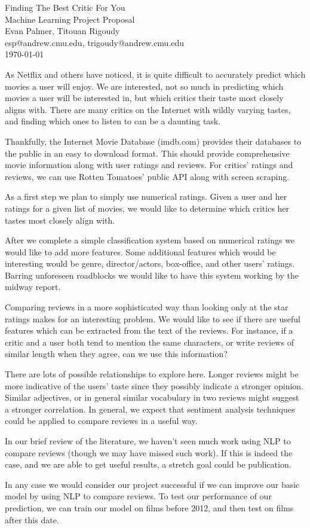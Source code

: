 \documentclass[12pt]{article}
\makeatletter
\newcommand{\myname}{Evan Palmer, Titouan Rigoudy}
\newcommand{\myandrew}{esp@andrew.cmu.edu, trigoudy@andrew.cmu.edu}
\newcommand{\thedate}{\today}
\makeatother
\begin{document}
	\medskip    
	\thispagestyle{plain}
	\begin{center}                 
	{\LARGE Finding The Best Critic For You} \\
	\medskip
	Machine Learning Project Proposal \\
	\smallskip
	\myname \\
	\myandrew \\
	\thedate \\
	\end{center}
	\vspace{0.5cm}

As Netflix and others have noticed, it is quite difficult to accurately predict which movies a user will enjoy. We are interested, not so much in predicting which movies a user will be interested in, but which critics their taste most closely aligns with. There are many critics on the Internet with wildly varying tastes, and finding which ones to listen to can be a daunting task.

Thankfully, the Internet Movie Database (imdb.com) provides their databases to the public in an easy to download format. This should provide comprehensive movie information along with user ratings and reviews. For critics' ratings and reviews, we can use Rotten Tomatoes' public API along with screen scraping.  

As a first step we plan to simply use numerical ratings. Given a user and her ratings for a given list of movies, we would like to determine which critics her tastes most closely align with.

After we complete a simple classification system based on numerical ratings we would like to add more features. Some additional features which would be interesting would be genre, director/actors, box-office, and other users' ratings. Barring unforeseen roadblocks we would like to have this system working by the midway report.

Comparing reviews in a more sophisticated way than looking only at the star ratings makes for an interesting problem. We would like to see if there are useful features which can be extracted from the text of the reviews. For instance, if a critic and a user both tend to mention the same characters, or write reviews of similar length when they agree, can we use this information?

There are lots of possible relationships to explore here. Longer reviews might be more indicative of the users' taste since they possibly indicate a stronger opinion. Similar adjectives, or in general similar vocabulary in two reviews might suggest a stronger correlation. In general, we expect that sentiment analysis techniques could be applied to compare reviews in a useful way.

In our brief review of the literature, we haven't seen much work using NLP to compare reviews (though we may have missed such work). If this is indeed the case, and we are able to get useful results, a stretch goal could be publication. 

In any case we would consider our project successful if we can improve our basic model by using NLP to compare reviews. To test our performance of our prediction, we can train our model on films before 2012, and then test on films after this date.
\end{document}
